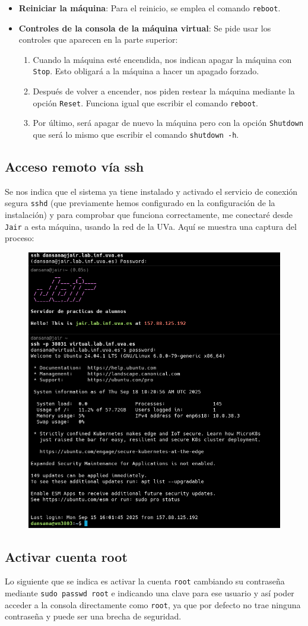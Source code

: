 \documentclass[10pt]{article}
\begin{document}
\begin{itemize}
		\item \textbf{Reiniciar la máquina}: Para el reinicio, se emplea el comando \verb|reboot|.
		\item \textbf{Controles de la consola de la máquina virtual}: Se pide usar los controles que aparecen en la parte superior:
		\begin{enumerate}
			\item Cuando la máquina esté encendida, nos indican apagar la máquina con \verb|Stop|. Esto obligará a la máquina a hacer un apagado forzado.
			\item Después de volver a encender, nos piden restear la máquina mediante la opción \verb|Reset|. Funciona igual que escribir el comando \verb|reboot|.
			\item Por último, será apagar de nuevo la máquina pero con la opción \verb|Shutdown| que será lo mismo que escribir el comando \verb|shutdown -h|.
		\end{enumerate}
	\end{itemize}
	\subsection{Acceso remoto vía ssh}
	Se nos indica que el sistema ya tiene instalado y activado el servicio de conexión segura \verb|sshd| (que previamente hemos configurado en la configuración de la instalación) y para comprobar que funciona correctamente, me conectaré desde \verb|Jair| a esta máquina, usando la red de la UVa. Aquí se muestra una captura del proceso:
	\begin{figure}[H]
		\setlength{\abovecaptionskip}{0cm}
		\setlength{\belowcaptionskip}{0cm}
		\centering
		\includegraphics[width=0.6\linewidth]{Recursos/ssh.png}
		\label{fig:datos}
	\end{figure}
	\subsection{Activar cuenta root}
	Lo siguiente que se indica es activar la cuenta \verb|root| cambiando su contraseña mediante \verb|sudo passwd root| e indicando una clave para ese usuario y así poder acceder a la consola directamente como \verb|root|, ya que por defecto no trae ninguna contraseña y puede ser una brecha de seguridad.
\end{document}
